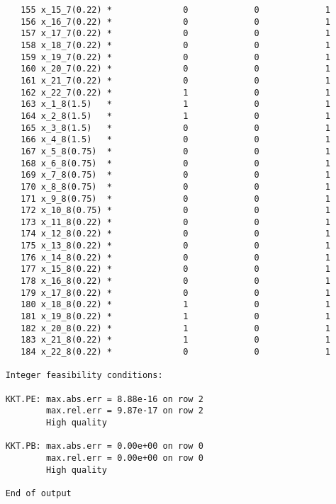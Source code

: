 \documentclass{article}[A4]
\begin{document}
\begin{verbatim}
	   155 x_15_7(0.22) *              0             0             1 
	   156 x_16_7(0.22) *              0             0             1 
	   157 x_17_7(0.22) *              0             0             1 
	   158 x_18_7(0.22) *              0             0             1 
	   159 x_19_7(0.22) *              0             0             1 
	   160 x_20_7(0.22) *              0             0             1 
	   161 x_21_7(0.22) *              0             0             1 
	   162 x_22_7(0.22) *              1             0             1 
	   163 x_1_8(1.5)   *              1             0             1 
	   164 x_2_8(1.5)   *              1             0             1 
	   165 x_3_8(1.5)   *              0             0             1 
	   166 x_4_8(1.5)   *              0             0             1 
	   167 x_5_8(0.75)  *              0             0             1 
	   168 x_6_8(0.75)  *              0             0             1 
	   169 x_7_8(0.75)  *              0             0             1 
	   170 x_8_8(0.75)  *              0             0             1 
	   171 x_9_8(0.75)  *              0             0             1 
	   172 x_10_8(0.75) *              0             0             1 
	   173 x_11_8(0.22) *              0             0             1 
	   174 x_12_8(0.22) *              0             0             1 
	   175 x_13_8(0.22) *              0             0             1 
	   176 x_14_8(0.22) *              0             0             1 
	   177 x_15_8(0.22) *              0             0             1 
	   178 x_16_8(0.22) *              0             0             1 
	   179 x_17_8(0.22) *              0             0             1 
	   180 x_18_8(0.22) *              1             0             1 
	   181 x_19_8(0.22) *              1             0             1 
	   182 x_20_8(0.22) *              1             0             1 
	   183 x_21_8(0.22) *              1             0             1 
	   184 x_22_8(0.22) *              0             0             1 
	
	Integer feasibility conditions:
	
	KKT.PE: max.abs.err = 8.88e-16 on row 2
	        max.rel.err = 9.87e-17 on row 2
	        High quality
	
	KKT.PB: max.abs.err = 0.00e+00 on row 0
	        max.rel.err = 0.00e+00 on row 0
	        High quality
	
	End of output
	
\end{verbatim}
\end{document}
